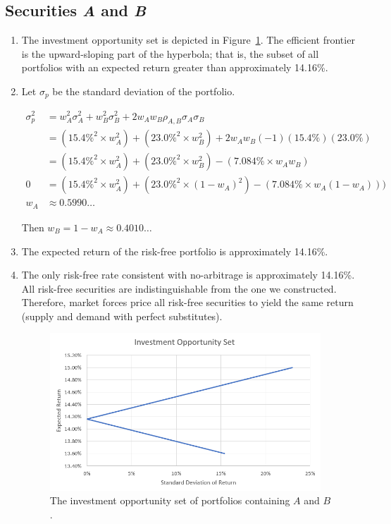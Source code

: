 \documentclass[12pt]{article}
\begin{document}
\subsection{Securities \textit{A} and \textit{B}}
\begin{enumerate}
\item The investment opportunity set is depicted in Figure~\ref{fig:ios}. The efficient frontier is the upward-sloping part of the hyperbola; that is, the subset of all portfolios with an expected return greater than approximately 14.16\%.
\item Let $\sigma_p$ be the standard deviation of the portfolio.

\begin{align*}
\sigma_p^2
&=w_A^2\sigma_A^2+w_B^2\sigma_B^2+2w_Aw_B\rho_{A,B}\sigma_A\sigma_B\\
&=\left(15.4\%^2\times w_A^2\right)+\left(23.0\%^2\times w_B^2\right)+2w_Aw_B(-1)(15.4\%)(23.0\%)\\
&=\left(15.4\%^2\times w_A^2\right)+\left(23.0\%^2\times w_B^2\right)-(7.084\%\times w_Aw_B)\\
0&=\left(15.4\%^2\times w_A^2\right)+\left(23.0\%^2\times(1-w_A)^2\right)-(7.084\%\times w_A(1-w_A)))\\
w_A&\approx 0.5990\dots
\end{align*}

Then $w_B=1-w_A\approx 0.4010\dots$

\item The expected return of the risk-free portfolio is approximately 14.16\%.
\item The only risk-free rate consistent with no-arbitrage is approximately 14.16\%. All risk-free securities are indistinguishable from the one we constructed. Therefore, market forces price all risk-free securities to yield the same return (supply and demand with perfect substitutes).
\begin{figure}
\begin{center}
\includegraphics[width=4in]{images/ios.png}
\end{center}
\caption{The investment opportunity set of portfolios containing $A$ and $B$.\label{fig:ios}}
\end{figure}
\end{enumerate}
\end{document}
